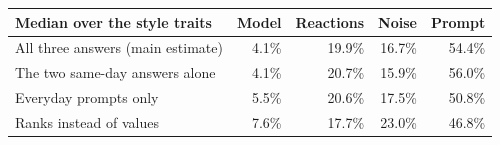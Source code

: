 \begin{tabular}{lrrrr}
\toprule
Median over the style traits & Model & Reactions & Noise & Prompt \\
\midrule
All three answers (main estimate) & 4.1\% & 19.9\% & 16.7\% & 54.4\% \\
The two same-day answers alone & 4.1\% & 20.7\% & 15.9\% & 56.0\% \\
Everyday prompts only & 5.5\% & 20.6\% & 17.5\% & 50.8\% \\
Ranks instead of values & 7.6\% & 17.7\% & 23.0\% & 46.8\% \\
\bottomrule
\end{tabular}
